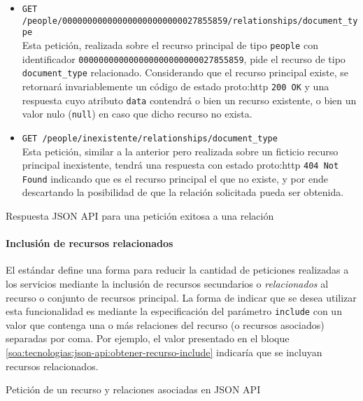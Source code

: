 \begin{itemize}
  \item \verb|GET /people/000000000000000000000000027855859/relationships/document_type|\\
    Esta petición, realizada sobre el recurso principal de tipo \texttt{people} con identificador \texttt{000000000000000000000000027855859}, pide el recurso de tipo \verb|document_type| relacionado. Considerando que el recurso principal existe, se retornará invariablemente un código de estado \gls{proto:http} \texttt{200 OK} y una respuesta cuyo atributo \texttt{data} contendrá o bien un recurso existente, o bien un valor nulo (\texttt{null}) en caso que dicho recurso no exista.
  \item \verb|GET /people/inexistente/relationships/document_type|\\
    Esta petición, similar a la anterior pero realizada sobre un ficticio recurso principal inexistente, tendrá una respuesta con estado \gls{proto:http} \texttt{404 Not Found} indicando que es el recurso principal el que no existe, y por ende descartando la posibilidad de que la relación solicitada pueda ser obtenida.
\end{itemize}

\begin{listing}
  \caption{Respuesta JSON API para una petición exitosa a una relación}
  \label{soa:tecnologias:json-api:respuesta-200-obtener-relacion}
\end{listing}

\paragraph{Inclusión de recursos relacionados}

El estándar define una forma para reducir la cantidad de peticiones realizadas a los servicios mediante la inclusión de recursos secundarios o \textit{relacionados} al recurso o conjunto de recursos principal. La forma de indicar que se desea utilizar esta funcionalidad es mediante la especificación del parámetro \texttt{include} con un valor que contenga una o más relaciones del recurso (o recursos asociados) separadas por coma. Por ejemplo, el valor presentado en el bloque \autoref{soa:tecnologias:json-api:obtener-recurso-include} indicaría que se incluyan recursos relacionados.

\begin{listing}
  \caption{Petición de un recurso y relaciones asociadas en JSON API}
  \label{soa:tecnologias:json-api:obtener-recurso-include}
\end{listing}

